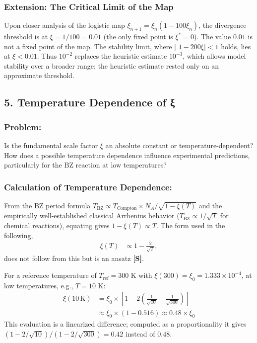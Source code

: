 	\subsubsection*{Extension: The Critical Limit of the Map}
	Upon closer analysis of the logistic map $\xi_{n+1} = \xi_n (1 - 100 \xi_n)$, the divergence threshold is at $\xi = 1/100 = 0.01$ (the only fixed point is $\xi^* = 0$). The value $0.01$ is not a fixed point of the map. The stability limit, where | $1 - 200 \xi| < 1 $ holds, lies at $\xi < 0.01$. Thus $10^{-2}$ replaces the heuristic estimate $10^{-3}$, which allows model stability over a broader range; the heuristic estimate rested only on an approximate threshold.
	
	\subsection*{5. Temperature Dependence of ξ}
	
	\subsubsection*{Problem:}
	Is the fundamental scale factor $\xi$ an absolute constant or temperature-dependent? How does a possible temperature dependence influence experimental predictions, particularly for the BZ reaction at low temperatures?
	
	\subsubsection*{Calculation of Temperature Dependence:}
	
	From the BZ period formula $T_{\text{BZ}} \propto T_{\text{Compton}} \times N_A / \sqrt{1 - \xi(T)}$ and the empirically well-established classical Arrhenius behavior ($T_{\text{BZ}} \propto 1/\sqrt{T}$ for chemical reactions), equating gives $1-\xi(T) \propto T$. The form used in the following,
	\begin{align*}
		\xi(T) &\propto 1 - \frac{2}{\sqrt{T}},
	\end{align*}
	does not follow from this but is an ansatz \textbf{[S]}.
	
	For a reference temperature of $T_{\text{ref}} = 300$ K with $\xi(300) = \xi_0 = 1.333 \times 10^{-4}$, at low temperatures, e.g., $T = 10$ K:
	\begin{align*}
		\xi(10 \, \text{K}) &= \xi_0 \times \left[1 - 2\left(\frac{1}{\sqrt{10}} - \frac{1}{\sqrt{300}}\right)\right] \\
		&\approx \xi_0 \times (1 - 0.516) \approx 0.48 \times \xi_0
	\end{align*}
	This evaluation is a linearized difference; computed as a proportionality it gives $(1-2/\sqrt{10})/(1-2/\sqrt{300}) = 0.42$ instead of $0.48$.
	
